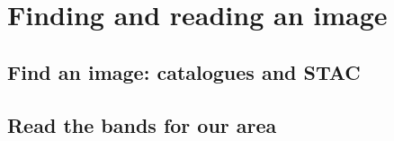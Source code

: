 \chapter{Finding and reading an image}\label{ch:raster}
\section{Find an image: catalogues and STAC}

\section{Read the bands for our area}

